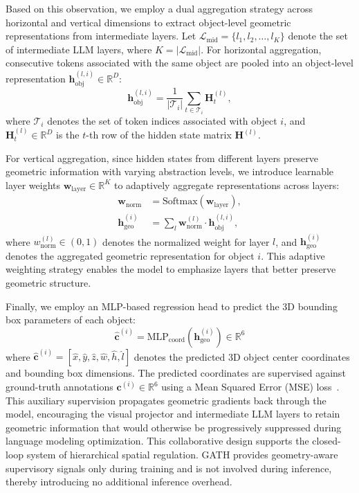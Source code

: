 \documentclass[lettersize,journal]{IEEEtran}
\begin{document}
Based on this observation, we employ a dual aggregation strategy across horizontal and vertical dimensions to extract object-level geometric representations from intermediate layers. Let $\mathcal{L}_{\text{mid}} = \{l_1, l_2, \dots, l_K\}$ denote the set of intermediate LLM layers, where $K = |\mathcal{L}_{\text{mid}}|$. For horizontal aggregation, consecutive tokens associated with the same object are pooled into an object-level representation $\mathbf{h}_{\text{obj}}^{(l, i)} \in \mathbb{R}^{D}$:
\begin{equation}
\mathbf{h}_{\text{obj}}^{(l, i)} = \frac{1}{|\mathcal{T}_i|} \sum_{t \in \mathcal{T}_i} \mathbf{H}^{(l)}_{t},
\end{equation}
where $\mathcal{T}_i$ denotes the set of token indices associated with object $i$, and $\mathbf{H}^{(l)}_{t} \in \mathbb{R}^{D}$ is the $t$-th row of the hidden state matrix $\mathbf{H}^{(l)}$.

For vertical aggregation, since hidden states from different layers preserve geometric information with varying abstraction levels, we introduce learnable layer weights $\mathbf{w}_{\text{layer}} \in \mathbb{R}^{K}$ to adaptively aggregate representations across layers:
\begin{align}
\mathbf{w}_{\text{norm}} &= \text{Softmax}(\mathbf{w}_{\text{layer}}),\\
\mathbf{h}_{\text{geo}}^{(i)} &= \sum_{l} \mathbf{w}_{\text{norm}}^{(l)} \cdot \mathbf{h}_{\text{obj}}^{(l, i)},
\end{align}
where $w_{\text{norm}}^{(l)} \in (0,1)$ denotes the normalized weight for layer $l$, and $\mathbf{h}_{\text{geo}}^{(i)}$ denotes the aggregated geometric representation for object $i$. This adaptive weighting strategy enables the model to emphasize layers that better preserve geometric structure.

Finally, we employ an MLP-based regression head to predict the 3D bounding box parameters of each object:
\begin{equation}
\hat{\mathbf{c}}^{(i)} = \text{MLP}_{\text{coord}}(\mathbf{h}_{\text{geo}}^{(i)}) \in \mathbb{R}^6
\end{equation}
where $\hat{\mathbf{c}}^{(i)}=[\hat{x},\hat{y},\hat{z},\hat{w},\hat{h},\hat{l}]$ denotes the predicted 3D object center coordinates and bounding box dimensions. The predicted coordinates are supervised against ground-truth annotations $\mathbf{c}^{(i)} \in \mathbb{R}^{6}$ using a {Mean Squared Error (MSE)} loss~\cite{mseloss}. This auxiliary supervision propagates geometric gradients back through the model, encouraging the visual projector and intermediate LLM layers to retain {geometric} information that would otherwise be progressively suppressed during language modeling  optimization. This collaborative design supports the closed-loop system of hierarchical spatial regulation. GATH provides geometry-aware supervisory signals only during training and is not involved during inference, thereby introducing no additional inference overhead.
\end{document}
